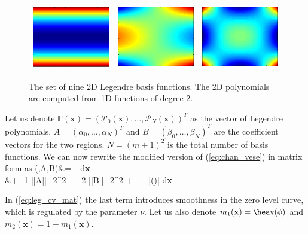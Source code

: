 \begin{figure}[ht]
\begin{tabular}{@{}ccc @{}}
	\includegraphics[width=.3\textwidth]{./images/Bases_color/7}  &
	\includegraphics[width=.3\textwidth]{./images/Bases_color/8}  &
	\includegraphics[width=.3\textwidth]{./images/Bases_color/9} 
\end{tabular}
\caption[2D Legendre polynomials]{The set of nine 2D Legendre basis functions. The 2D polynomials are computed from 1D functions of degree 2.}
\label{fig:legendre_bases}
\end{figure}

Let us denote $\mathbb{P}(\textbf{x})=\left(\mathcal{P}_0(\textbf{x}),\ldots, \mathcal{P}_{N}(\textbf{x})\right)^T$ as the vector of Legendre polynomials. $A=\left(\alpha_0,\ldots,\alpha_{N} \right)^T$ and $B=\left(\beta_0,\ldots,\beta_{N} \right)^T$ are the coefficient vectors for the two regions. $N=(m+1)^2$ is the total number of basis functions. We can now rewrite the modified version of (\ref{eq:chan_vese}) in matrix form as
\bea
{}(\phi,A,B)&= \displaystyle\int_{\Omega}d\textbf{x} \nn \\
						    &+\lambda_1 ||A||_2^2  +\lambda_2 ||B||_2^2 + \nu\, \lint_{\Omega} |\nabla\heav(\phi)| d\textbf{x} 
\label{eq:leg_cv_mat}						  
\eea

In (\ref{eq:leg_cv_mat}) the last term introduces smoothness in the zero level curve, which is regulated by the parameter $\nu$.  Let us also denote  $m_1(\textbf{x})=\heav(\phi)$ and  $m_2(\textbf{x})=1-m_1(\textbf{x})$. 


